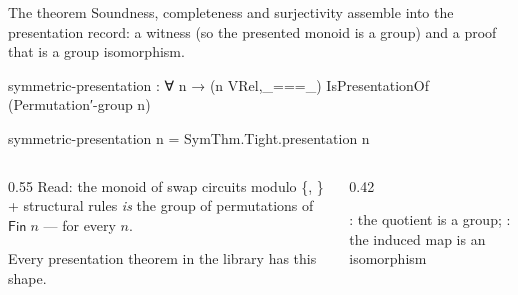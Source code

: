 \begin{frame}{The theorem \InPaper}
Soundness, completeness and surjectivity assemble into the
\alert{presentation record}: a  witness (so the presented
monoid is a group) and a proof that  is a group isomorphism.
\vspace{4pt}
\begin{code}
symmetric-presentation : ∀ n → (n VRel,_===_) IsPresentationOf (Permutation′-group n)
\end{code}
\begin{code}[hide]
symmetric-presentation n = SymThm.Tight.presentation n
\end{code}
\vspace{2pt}
\begin{columns}[c]
\begin{column}{0.55\textwidth}
\small Read: the monoid of swap circuits modulo \{,
\} + structural rules \emph{is} the group of permutations of
$\mathsf{Fin}\;n$ --- for every $n$.

\vspace{4pt}
Every presentation theorem in the library has this shape.
\end{column}
\begin{column}{0.42\textwidth}
\centering
{}

\vspace{4pt}
{\scriptsize {}: the quotient is a group; : the induced map is an isomorphism}
\end{column}
\end{columns}
\end{frame}
